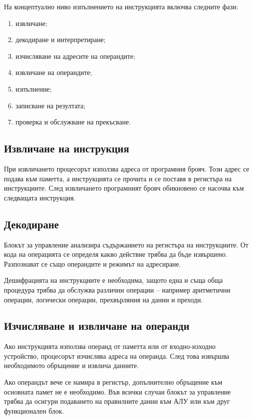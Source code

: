 На концептуално ниво изпълнението на инструкцията включва следните фази:

\begin{enumerate}
    \item извличане;
    \item декодиране и интерпретиране;
    \item изчисляване на адресите на операндите;
    \item извличане на операндите;
    \item изпълнение;
    \item записване на резултата;
    \item проверка и обслужване на прекъсване.
\end{enumerate}

\subsection{Извличане на инструкция}\label{s:9.4.1}

При извличането процесорът използва адреса от програмния брояч. Този адрес се подава към паметта, а инструкцията се прочита и се поставя в регистъра на инструкциите. След извличането програмният брояч обикновено се насочва към следващата инструкция.

\subsection{Декодиране}\label{s:9.4.2}

Блокът за управление анализира съдържанието на регистъра на инструкциите. От кода на операцията се определя какво действие трябва да бъде извършено. Разпознават се също операндите и режимът на адресиране.

Дешифрацията на инструкциите е необходима, защото една и съща обща процедура трябва да обслужва различни операции -- например аритметични операции, логически операции, прехвърляния на данни и преходи.

\subsection{Изчисляване и извличане на операнди}\label{s:9.4.3}

Ако инструкцията използва операнд от паметта или от входно-изходно устройство, процесорът изчислява адреса на операнда. След това извършва необходимото обръщение и извлича данните.

Ако операндът вече се намира в регистър, допълнително обръщение към основната памет не е необходимо. Във всички случаи блокът за управление трябва да осигури подаването на правилните данни към АЛУ или към друг функционален блок.

